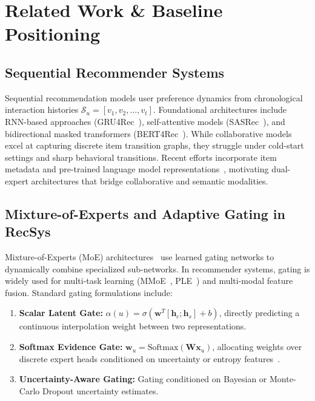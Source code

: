 
\section{Related Work \& Baseline Positioning}
\label{sec:related_work}

\subsection{Sequential Recommender Systems}
Sequential recommendation models user preference dynamics from chronological interaction histories $\mathcal{S}_u = [v_1, v_2, \dots, v_t]$. Foundational architectures include RNN-based approaches (GRU4Rec~\cite{hidasi2016session}), self-attentive models (SASRec~\cite{kang2018self}), and bidirectional masked transformers (BERT4Rec~\cite{sun2019bert4rec}). While collaborative models excel at capturing discrete item transition graphs, they struggle under cold-start settings and sharp behavioral transitions. Recent efforts incorporate item metadata and pre-trained language model representations~\cite{hou2022towards,petrov2023effective,wu2021multimodal}, motivating dual-expert architectures that bridge collaborative and semantic modalities.

\subsection{Mixture-of-Experts and Adaptive Gating in RecSys}
Mixture-of-Experts (MoE) architectures~\cite{shazeer2017outrageously,ma2018modeling} use learned gating networks to dynamically combine specialized sub-networks. In recommender systems, gating is widely used for multi-task learning (MMoE~\cite{ma2018modeling}, PLE~\cite{tang2020progressive}) and multi-modal feature fusion. Standard gating formulations include:
\begin{enumerate}[leftmargin=*]
    \item \textbf{Scalar Latent Gate:} $\alpha(u) = \sigma(\mathbf{w}^T [\mathbf{h}_c; \mathbf{h}_s] + b)$, directly predicting a continuous interpolation weight between two representations.
    \item \textbf{Softmax Evidence Gate:} $\mathbf{w}_u = \text{Softmax}(\mathbf{W} \mathbf{x}_u)$, allocating weights over discrete expert heads conditioned on uncertainty or entropy features~\cite{kendall2017uncertainties}.
    \item \textbf{Uncertainty-Aware Gating:} Gating conditioned on Bayesian or Monte-Carlo Dropout uncertainty estimates.
\end{enumerate}

